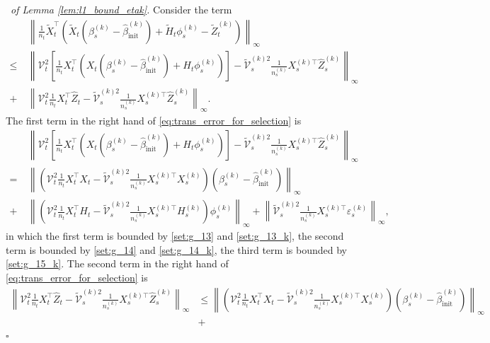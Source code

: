 \documentclass[12pt]{article}
\newenvironment{pf}{{\noindent \it Proof}\ }{\hfill $\square$\par}
\begin{document}
\begin{pf}{\it of Lemma \ref{lem:l1_bound_etak}. }
Consider the term 
    \begin{equation}
    \label{eq:trans_error_for_selection}
        \begin{aligned}
                   &  \left\|\frac{1}{n_t}\tilde{X}_t^\top\left(\tilde{X}_t\left(\beta_s^{(k)}-\hat{\beta}_{\text{init}}^{(k)}\right) +\tilde{H}_t\phi_s^{(k)}- \tilde{Z}_t^{(k)}\right)\right\|_{\infty} \\ \le\ &  \left\|\mathcal{V}_t^2\left[\frac{1}{n_t}X_t^\top\left(X_t\left(\beta_s^{(k)}-\hat{\beta}_{\text{init}}^{(k)}\right) +H_t\phi_s^{(k)}\right)\right] - \tilde{\mathcal{V}}_s^{(k)2}\frac{1}{n_s^{(k)}}X_s^{(k)\top} \hat{Z}_s^{(k)} \right\|_{\infty}\\ +\ &  \left\|\mathcal{V}_t^2\frac{1}{n_t} X_t^\top\hat{Z}_t - \tilde{\mathcal{V}}_s^{(k)2}\frac{1}{n_s^{(k)}}X_s^{(k)\top} \hat{Z}_s^{(k)}\right\|_{\infty}. 
        \end{aligned}
    \end{equation}
    The first term in the right hand of \eqref{eq:trans_error_for_selection} is 
    \begin{align*}
        & \left\|\mathcal{V}_t^2\left[\frac{1}{n_t}X_t^\top\left(X_t\left(\beta_s^{(k)}-\hat{\beta}_{\text{init}}^{(k)}\right) +H_t\phi_s^{(k)}\right)\right] - \tilde{\mathcal{V}}_s^{(k)2}\frac{1}{n_s^{(k)}}X_s^{(k)\top} \hat{Z}_s^{(k)}\right\|_{\infty} \\ =\ & \left\|\left(\mathcal{V}_t^2 \frac{1}{n_t}X_t^\top X_t - \tilde{\mathcal{V}}_s^{(k)2}\frac{1}{n_s^{(k)}}X_s^{(k)\top}X_s^{(k)}\right)\left(\beta_s^{(k)}-\hat{\beta}_{\text{init}}^{(k)}\right)\right\|_{\infty} \\+\ &  \left\|\left(\mathcal{V}_t^2 \frac{1}{n_t}X_t^\top H_t - \tilde{\mathcal{V}}_s^{(k)2}\frac{1}{n_s^{(k)}}X_s^{(k)\top}H_s^{(k)}\right)\phi_s^{(k)}\right\|_{\infty} + \left\|\tilde{\mathcal{V}}_s^{(k)2} \frac{1}{n_s^{(k)}} X_s^{(k)\top}\varepsilon_s^{(k)}\right\|_{\infty},
    \end{align*}
    in which the first term is bounded by \ref{set:g_13} and \ref{set:g_13_k}, the second term is bounded by \ref{set:g_14} and \ref{set:g_14_k}, the third term is bounded by \ref{set:g_15_k}. 
    The second term in the right hand of \eqref{eq:trans_error_for_selection} is 
    \begin{align*}
        \left\|\mathcal{V}_t^2\frac{1}{n_t} X_t^\top\hat{Z}_t - \tilde{\mathcal{V}}_s^{(k)2}\frac{1}{n_s^{(k)}}X_s^{(k)\top} \hat{Z}_s^{(k)}\right\|_{\infty} & \le \left\|\left(\mathcal{V}_t^2\frac{1}{n_t}X_t^\top X_t - \tilde{\mathcal{V}}_s^{(k)2}\frac{1}{n_s^{(k)}}X_s^{(k)\top}X_s^{(k)}\right)\left(\beta_s^{(k)} - \hat{\beta}_{\text{init}}^{(k)}\right)\right\|_{\infty}\\ & +

\end{align*}
\end{pf}
\end{document}
